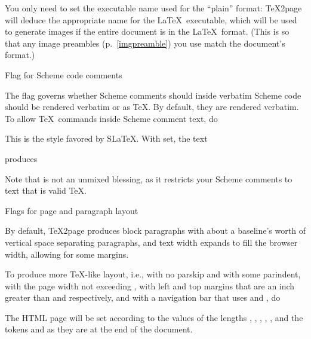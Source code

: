 
You only need to set the executable name used for the “plain” format:
\TeX2page will deduce the appropriate name for the \LaTeX\ executable,
which will be used to generate images if the entire document is in the
\LaTeX\ format.  (This is so that any image preambles
(p.~\ref{imgpreamble}) you use match the
document’s format.)

\beginsection Flag for Scheme code comments

The flag \p{\TZPslatexcomments} governs whether Scheme comments
should inside verbatim Scheme code should be rendered verbatim or as \TeX.
By default, they are rendered verbatim.   To allow \TeX\ commands inside
Scheme comment text, do


\n This is the style favored by S\LaTeX.
\ifx\shipout\UnDeFiNeD
With \p{\TZPslatexcomments} set, the text


\n produces
\let\TZPslatexcomments 1

\let\TZPslatexcomments 0

\fi
Note that \p{\TZPslatexcomments=1} is not an unmixed blessing, as it
restricts your Scheme comments to text that is valid \TeX.

\beginsection Flags for page and paragraph layout

%
By default, \TeX2page produces block paragraphs with about a
baseline’s worth of vertical space separating paragraphs, and text width
expands to fill the browser width, allowing for some margins.

To produce more \TeX-like layout, i.e., with no parskip and
with some parindent,
with the page width not exceeding \p{\hsize},
with left and top margins that are an inch greater than
\p{\hoffset} and \p{\voffset} respectively, and with a
navigation bar that uses \p{\headline} and \p{\footline},
do


%
The HTML page will be set according to the values of the
lengths \p{\hsize}, \p{\hoffset}, \p{\voffset},
\p{\parskip}, \p{\parindent}, and the tokens \p{\headline}
and \p{\footline} as they are at the end of
the document.

